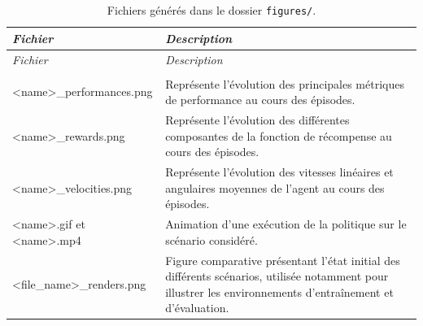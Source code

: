 \begin{longtable}{
        >{\ttfamily\small}p{}
        p{}
    }
    \caption{Fichiers générés dans le dossier \texttt{figures/}.}
    \label{tab:figure_files}                                                                                                                                                                    \\

    \toprule
    \textnormal{\textit{Fichier}} &
    \textit{Description}                                                                                                                                                                        \\
    \midrule
    \endfirsthead

    \toprule
    \textnormal{\textit{Fichier}} &
    \textit{Description}                                                                                                                                                                        \\
    \midrule
    \endhead

    \midrule
    \\
    \endfoot

    \bottomrule
    \endlastfoot

    <name>\_performances.png
                                  & Représente l'évolution des principales métriques de performance au cours des épisodes.                                                                      \\

    <name>\_rewards.png
                                  & Représente l'évolution des différentes composantes de la fonction de récompense au cours des épisodes.                                                      \\

    <name>\_velocities.png
                                  & Représente l'évolution des vitesses linéaires et angulaires moyennes de l'agent au cours des épisodes.                                                      \\

    <name>.gif \textnormal{et} <name>.mp4
                                  & Animation d'une exécution de la politique sur le scénario considéré.                                                                                        \\

    <file\_name>\_renders.png
                                  & Figure comparative présentant l'état initial des différents scénarios, utilisée notamment pour illustrer les environnements d'entraînement et d'évaluation. \\
\end{longtable}

